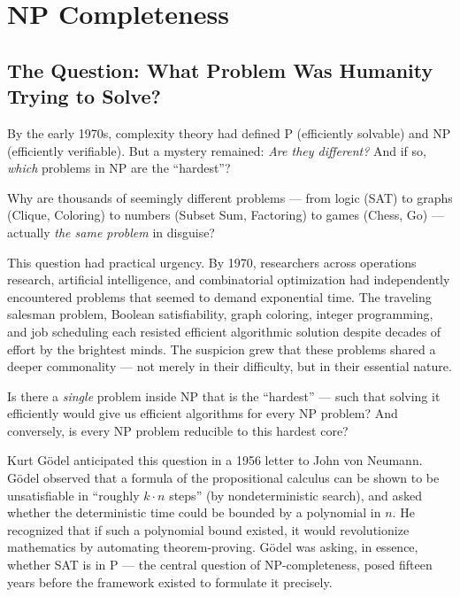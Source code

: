 
\chapter{NP Completeness}
\label{ch:np_complete}

\section{The Question: What Problem Was Humanity Trying to Solve?}
\label{sec:np:question}

By the early 1970s, complexity theory had defined P (efficiently solvable) and NP (efficiently verifiable). But a mystery remained: \emph{Are they different?} And if so, \emph{which} problems in NP are the ``hardest''?

Why are thousands of seemingly different problems — from logic (SAT) to graphs (Clique, Coloring) to numbers (Subset Sum, Factoring) to games (Chess, Go) — actually \emph{the same problem} in disguise?

This question had practical urgency. By 1970, researchers across operations research, artificial intelligence, and combinatorial optimization had independently encountered problems that seemed to demand exponential time. The traveling salesman problem, Boolean satisfiability, graph coloring, integer programming, and job scheduling each resisted efficient algorithmic solution despite decades of effort by the brightest minds. The suspicion grew that these problems shared a deeper commonality — not merely in their difficulty, but in their essential nature.

Is there a \emph{single} problem inside NP that is the ``hardest'' — such that solving it efficiently would give us efficient algorithms for every NP problem? And conversely, is every NP problem reducible to this hardest core?

Kurt G\"odel anticipated this question in a 1956 letter to John von Neumann. G\"odel observed that a formula of the propositional calculus can be shown to be unsatisfiable in ``roughly $k \cdot n$ steps'' (by nondeterministic search), and asked whether the deterministic time could be bounded by a polynomial in $n$. He recognized that if such a polynomial bound existed, it would revolutionize mathematics by automating theorem-proving. G\"odel was asking, in essence, whether SAT is in P — the central question of NP-completeness, posed fifteen years before the framework existed to formulate it precisely.

